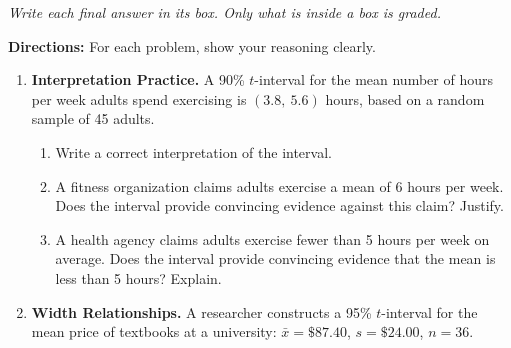 \documentclass[10pt]{article}
\begin{document}
{\small\itshape Write each final answer in its box. Only what is inside a box is graded.}\par

\vspace{0.1in}
\textbf{Directions:} For each problem, show your reasoning clearly.

\begin{enumerate}

  \item \textbf{Interpretation Practice.} A 90\% $t$-interval for the mean
        number of hours per week adults spend exercising is $(3.8,\ 5.6)$ hours,
        based on a random sample of 45 adults.

        \begin{enumerate}[label=\alph*.]
          \boxguard
          \item Write a correct interpretation of the interval. 

          \boxguard

          \item A fitness organization claims adults exercise a mean of 6 hours per
                week. Does the interval provide convincing evidence against this
                claim? Justify. 

          \boxguard

          \item A health agency claims adults exercise fewer than 5 hours per week
                on average. Does the interval provide convincing evidence that the
                mean is less than 5 hours? Explain. 
        \end{enumerate}

  \newpage

  \item \textbf{Width Relationships.} A researcher constructs a 95\% $t$-interval
        for the mean price of textbooks at a university: $\bar x = \$87.40$,
        $s = \$24.00$, $n = 36$.


\end{enumerate}
\end{document}
